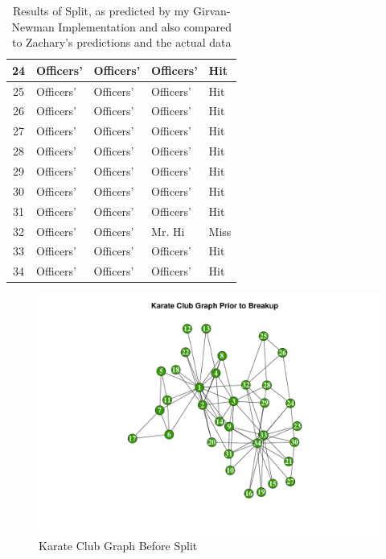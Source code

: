 \documentclass[letterpaper,11pt]{article}
\begin{document}
\begin{table}
\begin{tabular}{ | c | p{2cm} | p{2cm} | p{2cm} | p{2cm} | }
24 & Officers' & Officers' & Officers' & Hit \\
\hline
25 & Officers' & Officers' & Officers' & Hit \\
\hline
26 & Officers' & Officers' & Officers' & Hit \\
\hline
27 & Officers' & Officers' & Officers' & Hit \\
\hline
28 & Officers' & Officers' & Officers' & Hit \\
\hline
29 & Officers' & Officers' & Officers' & Hit \\
\hline
30 & Officers' & Officers' & Officers' & Hit \\
\hline
31 & Officers' & Officers' & Officers' & Hit \\
\hline
32 & Officers' & Officers' & Mr. Hi & Miss \\
\hline
33 & Officers' & Officers' & Officers' & Hit \\
\hline
34 & Officers' & Officers' & Officers' & Hit \\
\hline
\end{tabular}
\caption{Results of Split, as predicted by my Girvan-Newman Implementation and also compared to Zachary's predictions and the actual data}
\label{tab:results}
\end{table}

\clearpage
\begin{figure}[h]
\includegraphics[scale=0.5]{club-before.pdf}
\caption{Karate Club Graph Before Split}
\label{fig:club-before}
\end{figure}
\end{document}

